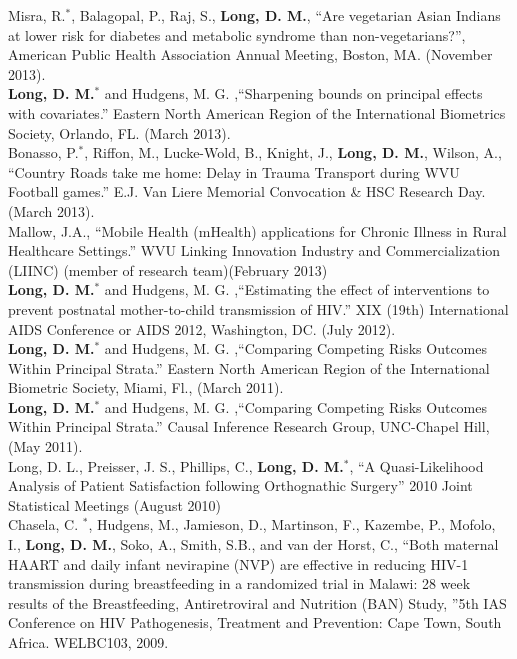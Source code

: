 \documentclass[10pt]{article}
\begin{document}
Misra, R.$^\ast$, Balagopal, P., Raj, S., \textbf{Long, D. M.}, ``Are vegetarian Asian Indians at lower risk for diabetes and metabolic syndrome than non-vegetarians?'', American Public Health Association Annual Meeting, Boston, MA. (November 2013).\\

\textbf{Long, D. M.}$^\ast$ and Hudgens, M. G. ,``Sharpening bounds on principal effects with covariates.'' Eastern North American Region of the International Biometrics Society, Orlando, FL. (March 2013).\\

Bonasso, P.$^\ast$, Riffon, M., Lucke-Wold, B., Knight, J., \textbf{Long, D. M.}, Wilson, A., ``Country Roads take me home: Delay in Trauma Transport during WVU Football games.'' E.J. Van Liere Memorial Convocation \& HSC Research Day. (March 2013). \\

Mallow, J.A., ``Mobile Health (mHealth) applications for Chronic Illness in Rural Healthcare Settings.''  WVU Linking Innovation Industry and Commercialization (LIINC) (member of research team)(February 2013) \\

\textbf{Long, D. M.}$^\ast$ and Hudgens, M. G. ,``Estimating the effect of interventions to prevent postnatal mother-to-child transmission of HIV.'' XIX (19th) International AIDS Conference or AIDS 2012, Washington, DC. (July 2012).\\

\textbf{Long, D. M.}$^\ast$ and Hudgens, M. G. ,``Comparing Competing Risks Outcomes Within Principal Strata.'' Eastern North American
Region of the International Biometric Society, Miami, Fl., (March 2011).\\

\textbf{Long, D. M.}$^\ast$ and Hudgens, M. G. ,``Comparing Competing Risks Outcomes Within Principal Strata.''  Causal Inference Research Group, UNC-Chapel Hill, (May 2011).\\

Long, D. L., Preisser, J. S., Phillips, C., \textbf{Long, D. M.}$^\ast$,  ``A Quasi-Likelihood Analysis of Patient Satisfaction following Orthognathic Surgery'' 2010 Joint Statistical Meetings (August 2010)  \\

Chasela, C. $^\ast$, Hudgens, M., Jamieson, D., Martinson, F.,  Kazembe, P., Mofolo, I., \textbf{Long, D. M.}, Soko, A., Smith, S.B., and van der Horst, C., ``Both maternal HAART and daily infant nevirapine (NVP) are effective in reducing HIV-1 transmission during breastfeeding in a randomized trial in Malawi: 28 week results of the Breastfeeding, Antiretroviral and Nutrition (BAN) Study, ''5th IAS Conference on HIV Pathogenesis, Treatment and Prevention: Cape Town, South Africa. WELBC103, 2009. 
\end{document}
